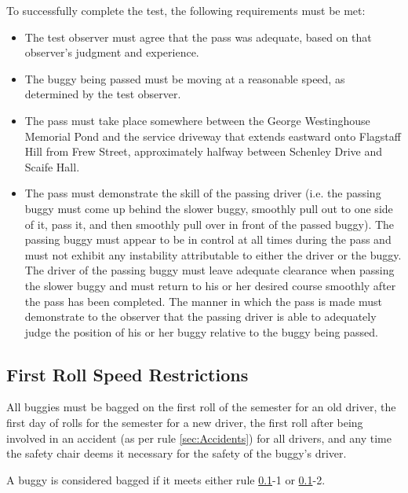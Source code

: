 	\noindent To successfully complete the test, the following requirements must be met:

	\begin{itemize}

		\item The test observer must agree that the pass was adequate, based on
		that observer's judgment and experience.

		\item The buggy being passed must be moving at a reasonable speed, as
		determined by the test observer.

		\item The pass must take place somewhere between the George Westinghouse
		Memorial Pond and the service driveway that extends eastward onto Flagstaff
		Hill from Frew Street, approximately halfway between Schenley Drive and Scaife
		Hall.

		\item The pass must demonstrate the skill of the passing driver (i.e. the
		passing buggy must come up behind the slower buggy, smoothly pull out to one
		side of it, pass it, and then smoothly pull over in front of the passed buggy).
		The passing buggy must appear to be in control at all times during the pass and
		must not exhibit any instability attributable to either the driver or the
		buggy. The driver of the passing buggy must leave adequate clearance when
		passing the slower buggy and must return to his or her desired course smoothly
		after the pass has been completed. The manner in which the pass is made must
		demonstrate to the observer that the passing driver is able to adequately judge
		the position of his or her buggy relative to the buggy being passed.

	\end{itemize}

\subsection{First Roll Speed Restrictions}
\label{sec:FirstRollSpeedRestrictions}

	All buggies must be bagged on the first roll of the semester for an old driver, the
	first day of rolls for the semester for a new driver, the first roll after being involved
	in an accident (as per rule \ref{sec:Accidents}) for all drivers, and any time the safety
	chair deems it necessary for the safety of the buggy's driver.

	A buggy is considered bagged if it meets either rule
	\ref{sec:FirstRollSpeedRestrictions}-1 or \ref{sec:FirstRollSpeedRestrictions}-2.

